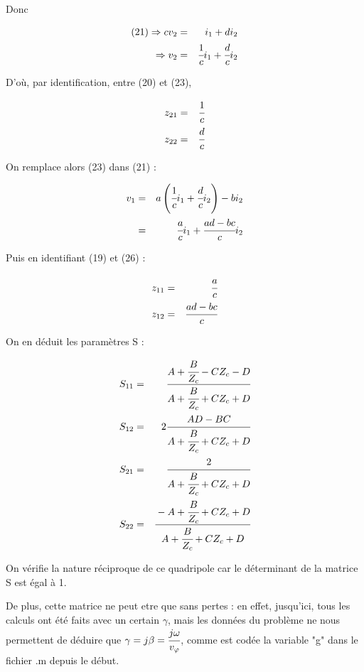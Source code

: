\documentclass[10pt]{article}
\begin{document}
\begin{itemize}
        Donc

        \begin{eqnarray}
            (21) \Rightarrow c v_2 &=& i_1 + d i_2 \nonumber \\
            \Rightarrow v_2 &=& \cfrac{1}{c} i_1 + \cfrac{d}{c} i_2
        \end{eqnarray}

        D'où, par identification, entre (20) et (23), 

        \begin{eqnarray}
            z_{21} &=& \cfrac{1}{c} \\
            z_{22} &=& \cfrac{d}{c}
        \end{eqnarray}

        On remplace alors (23) dans (21) :

        \begin{eqnarray}
            v_1 &=& a \left( \cfrac{1}{c} i_1 + \cfrac{d}{c} i_2 \right) - b i_2 \nonumber \\
            &=& \cfrac{a}{c} i_1 + \cfrac{a d - b c}{c} i_2
        \end{eqnarray}

        Puis en identifiant (19) et (26) :

        \begin{eqnarray}
            z_{11} &=& \cfrac{a}{c} \\
            z_{12} &=& \cfrac{a d - b c}{c}
        \end{eqnarray}

        On en déduit les paramètres S :

        \begin{eqnarray}
            S_{11} &=& \cfrac{A + \cfrac{B}{Z_c} - C Z_c - D}{A+\cfrac{B}{Z_c} +C Z_c +D} \\
            S_{12} &=& 2 \cfrac{A D - B C}{A+\cfrac{B}{Z_c} +C Z_c +D} \\
            S_{21} &=& \cfrac{2}{A+\cfrac{B}{Z_c} +C Z_c +D} \\
            S_{22} &=& \cfrac{-A +\cfrac{B}{Z_c} + C Z_c +D}{A+\cfrac{B}{Z_c} +C Z_c +D}
        \end{eqnarray}

        On vérifie la nature réciproque de ce quadripole car le déterminant de la matrice S est égal à 1.

        De plus, cette matrice ne peut etre que sans pertes : en effet, jusqu'ici, tous les calculs ont été faits avec un certain $\gamma$, mais les données du problème ne nous permettent de déduire que $\gamma = j \beta = \cfrac{j \omega}{v_\varphi}$, comme est codée la variable "g" dans le fichier .m depuis le début.


\end{itemize}
\end{document}
